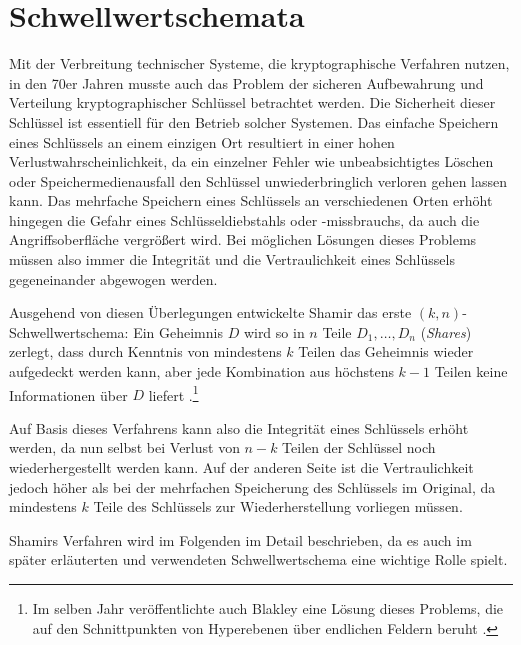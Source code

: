 \section{Schwellwertschemata}

\label{sec_basics_threshold}


Mit der Verbreitung technischer Systeme, die kryptographische Verfahren nutzen, in den 70er Jahren musste auch das Problem der sicheren Aufbewahrung und Verteilung kryptographischer Schlüssel betrachtet werden. Die Sicherheit dieser Schlüssel ist essentiell für den Betrieb solcher Systemen. Das einfache Speichern eines Schlüssels an einem einzigen Ort resultiert in einer hohen Verlustwahrscheinlichkeit, da ein einzelner Fehler wie unbeabsichtigtes Löschen oder Speichermedienausfall den Schlüssel unwiederbringlich verloren gehen lassen kann. Das mehrfache Speichern eines Schlüssels an verschiedenen Orten erhöht hingegen die Gefahr eines Schlüsseldiebstahls oder -missbrauchs, da auch die Angriffsoberfläche vergrößert wird. Bei möglichen Lösungen dieses Problems müssen also immer die Integrität und die Vertraulichkeit eines Schlüssels gegeneinander abgewogen werden. \cite{gemmell1997}

Ausgehend von diesen Überlegungen entwickelte Shamir das erste \((k,n)\)-Schwellwertschema: Ein Geheimnis \(D\) wird so in \(n\) Teile \(D_1, \dots, D_n\) (\textit{Shares}) zerlegt, dass durch Kenntnis von mindestens \(k\) Teilen das Geheimnis wieder aufgedeckt werden kann, aber jede Kombination aus höchstens \(k-1\) Teilen keine Informationen über \(D\) liefert \cite{shamir1979}.\footnote{
  Im selben Jahr veröffentlichte auch Blakley eine Lösung dieses Problems, die auf den Schnittpunkten von Hyperebenen über endlichen Feldern beruht \cite{blakley1979}.
} 

Auf Basis dieses Verfahrens kann also die Integrität eines Schlüssels erhöht werden, da nun selbst bei Verlust von \(n-k\) Teilen der Schlüssel noch wiederhergestellt werden kann. Auf der anderen Seite ist die Vertraulichkeit jedoch höher als bei der mehrfachen Speicherung des Schlüssels im Original, da mindestens \(k\) Teile des Schlüssels zur Wiederherstellung vorliegen müssen.

Shamirs Verfahren wird im Folgenden im Detail beschrieben, da es auch im später erläuterten und verwendeten Schwellwertschema eine wichtige Rolle spielt.

